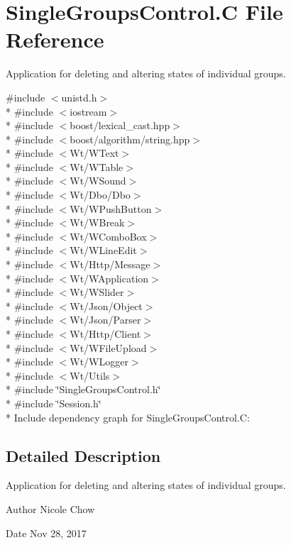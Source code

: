\hypertarget{SingleGroupsControl_8C}{}\section{Single\+Groups\+Control.\+C File Reference}
\label{SingleGroupsControl_8C}


Application for deleting and altering states of individual groups.  


{\ttfamily \#include $<$unistd.\+h$>$}\\*
{\ttfamily \#include $<$iostream$>$}\\*
{\ttfamily \#include $<$boost/lexical\+\_\+cast.\+hpp$>$}\\*
{\ttfamily \#include $<$boost/algorithm/string.\+hpp$>$}\\*
{\ttfamily \#include $<$Wt/\+W\+Text$>$}\\*
{\ttfamily \#include $<$Wt/\+W\+Table$>$}\\*
{\ttfamily \#include $<$Wt/\+W\+Sound$>$}\\*
{\ttfamily \#include $<$Wt/\+Dbo/\+Dbo$>$}\\*
{\ttfamily \#include $<$Wt/\+W\+Push\+Button$>$}\\*
{\ttfamily \#include $<$Wt/\+W\+Break$>$}\\*
{\ttfamily \#include $<$Wt/\+W\+Combo\+Box$>$}\\*
{\ttfamily \#include $<$Wt/\+W\+Line\+Edit$>$}\\*
{\ttfamily \#include $<$Wt/\+Http/\+Message$>$}\\*
{\ttfamily \#include $<$Wt/\+W\+Application$>$}\\*
{\ttfamily \#include $<$Wt/\+W\+Slider$>$}\\*
{\ttfamily \#include $<$Wt/\+Json/\+Object$>$}\\*
{\ttfamily \#include $<$Wt/\+Json/\+Parser$>$}\\*
{\ttfamily \#include $<$Wt/\+Http/\+Client$>$}\\*
{\ttfamily \#include $<$Wt/\+W\+File\+Upload$>$}\\*
{\ttfamily \#include $<$Wt/\+W\+Logger$>$}\\*
{\ttfamily \#include $<$Wt/\+Utils$>$}\\*
{\ttfamily \#include \char`\"{}Single\+Groups\+Control.\+h\char`\"{}}\\*
{\ttfamily \#include \char`\"{}Session.\+h\char`\"{}}\\*
Include dependency graph for Single\+Groups\+Control.\+C\+:


\subsection{Detailed Description}
Application for deleting and altering states of individual groups. 

\begin{DoxyAuthor}{Author}
Nicole Chow 
\end{DoxyAuthor}
\begin{DoxyDate}{Date}
Nov 28, 2017 
\end{DoxyDate}
